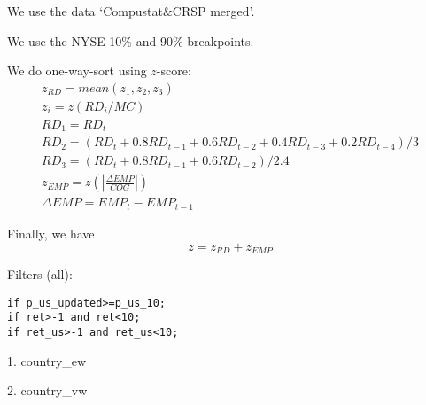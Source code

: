 

\usepackage[T1]{fontenc}




\thispagestyle{fancy}

\newcommand{\code}{\texttt}
\newcommand*{\Commonpath}{20190218/US-one-way-decile-nyse}


We use the data `Compustat\&CRSP merged'.

We use the NYSE 10\% and 90\% breakpoints. 



We do one-way-sort using $z$-score:
$$
\begin{aligned}
& z_{RD} = mean(z_1, z_2, z_3) \\
& z_i = z(RD_i/MC) \\
& RD_1 = RD_t \\
& RD_2 = (RD_t + 0.8RD_{t-1} + 0.6RD_{t-2} + 0.4RD_{t-3} + 0.2RD_{t-4})/3 \\
& RD_3 = (RD_t + 0.8RD_{t-1} + 0.6RD_{t-2})/2.4 
& \\
& z_{EMP} = z(|\frac{\Delta EMP}{COG}|) \\
& \Delta EMP = EMP_t - EMP_{t-1}
\end{aligned}
$$

Finally, we have
$$
z = z_{RD} + z_{EMP}
$$


Filters (all):

\code{if p\_us\_updated>=p\_us\_10;} \\
\code{if ret>-1 and ret<10;} \\
\code{if ret\_us>-1 and ret\_us<10;} \\


\small


1. country\_ew


2. country\_vw




% 

% 



